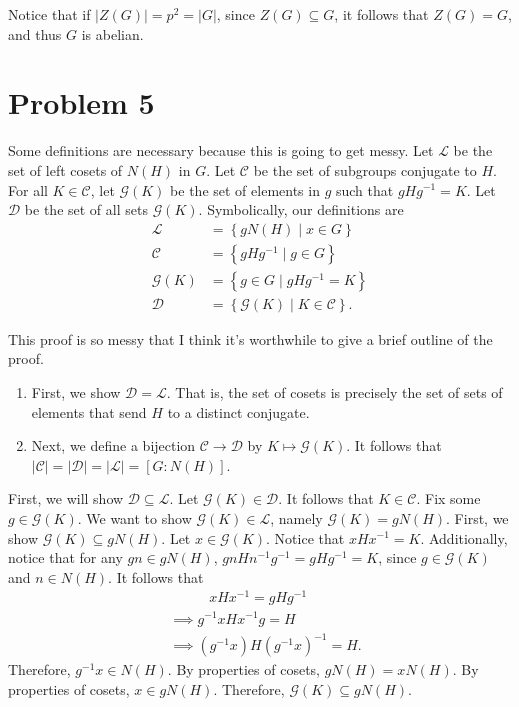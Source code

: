 \documentclass[11pt, letterpaper]{report}
\begin{document}
Notice that if $\left| Z(G) \right| =p^2=\left| G \right| $, since $Z(G)\subseteq G$, it follows that $Z(G)=G$, and thus $G$ is abelian.
\section*{Problem 5}
\begin{definition}
	Some definitions are necessary because this is going to get messy. Let $\mathcal{L} $ be the set of left cosets of $N(H)$ in $G$. Let $\mathcal{C} $ be the set of subgroups conjugate to $H$. For all $K\in \mathcal{C} $, let $\mathcal{G} (K)$ be the set of elements in $g$ such that $gHg ^{-1}=K$. Let $\mathcal{D} $ be the set of all sets $\mathcal{G} (K)$. Symbolically, our definitions are
	\begin{align*}
		\mathcal{L} &=\left\{ gN(H) \mid x\in G \right\} \\
		\mathcal{C} &=\left\{ gHg^{-1} \mid g\in G \right\} \\
		\mathcal{G} (K)&=\left\{ g\in G \mid gHg^{-1}=K \right\} \\
		\mathcal{D} &=\left\{ \mathcal{G} (K) \mid K\in \mathcal{C}  \right\} 
	.\end{align*}
\end{definition}
This proof is so messy that I think it's worthwhile to give a brief outline of the proof.
\begin{enumerate}
	\item First, we show $\mathcal{D} =\mathcal{L} $. That is, the set of cosets is precisely the set of sets of elements that send $H$ to a distinct conjugate.
	\item Next, we define a bijection $\mathcal{C} \to \mathcal{D} $ by $K\mapsto \mathcal{G} (K)$. It follows that $\left| \mathcal{C}  \right| =\left| \mathcal{D}  \right| =\left| \mathcal{L}  \right| =\left[ G : N(H) \right] $.
\end{enumerate}

First, we will show $\mathcal{D} \subseteq \mathcal{L} $. Let $\mathcal{G} (K)\in \mathcal{D} $. It follows that $K\in \mathcal{C} $. Fix some $g\in \mathcal{G} (K)$. We want to show $\mathcal{G} (K)\in \mathcal{L} $, namely $\mathcal{G} (K)=gN(H)$. First, we show $\mathcal{G} (K)\subseteq gN(H)$. Let $x\in \mathcal{G} (K)$. Notice that $xHx ^{-1}=K$. Additionally, notice that for any $gn\in gN(H)$, $gnHn ^{-1}g^{-1}=gHg^{-1}=K$, since $g\in \mathcal{G} (K)$ and $n\in N(H)$. It follows that
\begin{align*}
	&\qquad\;\;\;  xHx ^{-1}=gHg^{-1}\\
	&\implies g^{-1}xHx ^{-1}g=H\\
	&\implies \left( g^{-1} x\right)H\left( g^{-1}x \right) ^{-1}=H 
.\end{align*}
Therefore, $g^{-1}x\in N(H)$. By properties of cosets, $gN(H)=xN(H)$. By properties of cosets, $x\in gN(H)$. Therefore, $\mathcal{G} (K)\subseteq gN(H)$.
\end{document}
